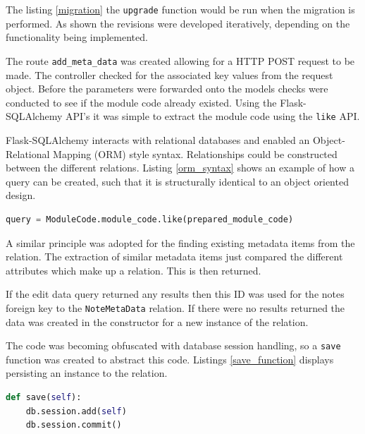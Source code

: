 {{{{{{{The listing \ref{migration} the \texttt{upgrade} function would be run when the migration is performed. As shown the revisions were developed iteratively, depending on the functionality being implemented.

The route \texttt{add\_meta\_data} was created allowing for a HTTP POST request to be made. The controller checked for the associated key values from the request object. Before the parameters were forwarded onto the models checks were conducted to see if the module code already existed. Using the Flask-SQLAlchemy \cite{citeulike:14025864} API's it was simple to extract the module code using the \texttt{like} API.



Flask-SQLAlchemy interacts with relational databases and enabled an Object-Relational Mapping (ORM) style syntax. Relationships could be constructed between the different relations. Listing \ref{orm_syntax} shows an example of how a query can be created, such that it is structurally identical to an object oriented design.

\begin{lstlisting}[language=python, caption={The module code class calls the module code attribute and compared its value against a prepared module code.}, label={orm_syntax}, breaklines, columns=fullflexible, keywordstyle=\color{blue}]
    query = ModuleCode.module_code.like(prepared_module_code)
\end{lstlisting}

A similar principle was adopted for the finding existing metadata items from the relation. The extraction of similar metadata items just compared the different attributes which make up a relation. This is then returned.

If the edit data query returned any results then this ID was used for the notes foreign key to the \texttt{NoteMetaData} relation. If there were no results returned the data was created in the constructor for a new instance of the relation.

The code was becoming obfuscated with database session handling, so a \texttt{save} function was created to abstract this code. Listings \ref{save_function} displays persisting an instance to the relation.
\begin{lstlisting}[language=python, caption={Save function that was abstracted to remove the db session handling from the controller}, label={save_function}, breaklines, columns=fullflexible, keywordstyle=\color{blue}]
  def save(self):
    db.session.add(self)
    db.session.commit()
\end{lstlisting}

}}}}}}}
